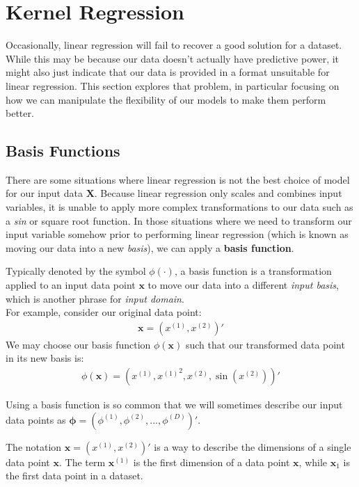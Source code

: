 \section{Kernel Regression}
Occasionally, linear regression will fail to recover a good solution for a dataset. While this may be because our data doesn't actually have predictive power, it might also just indicate that our data is provided in a format unsuitable for linear regression. This section explores that problem, in particular focusing on how we can manipulate the flexibility of our models to make them perform better.

\subsection{Basis Functions}
There are some situations where linear regression is not the best choice of model for our input data $\bm{X}$. Because linear regression only scales and combines input variables, it is unable to apply more complex transformations to our data such as a \textit{sin} or square root function. In those situations where we need to transform our input variable somehow prior to performing linear regression (which is known as moving our data into a new \textit{basis}), we can apply a \textbf{basis function}.

\begin{definition}
    Typically denoted by the symbol $\phi(\cdot)$, a basis function is a transformation applied to an input data point $\bm{x}$ to move our data into a different \textit{input basis}, which is another phrase for \textit{input domain}. \\

    For example, consider our original data point:
    \begin{align*}
    \bm{x} = (x^{(1)}, x^{(2)})'
    \end{align*}
    We may choose our basis function $\phi(\bm{x})$ such that our transformed data point in its new basis is:
    \begin{align*}
        \phi(\bm{x}) = (x^{(1)}, {x^{(1)}}^2, x^{(2)}, \sin(x^{(2)}))'
    \end{align*}

    Using a basis function is so common that we will sometimes describe our input data points as $\boldsymbol{\phi} = (\phi^{(1)}, \phi^{(2)}, ..., \phi^{(D)})'$.
\end{definition}

\begin{warning}
    The notation $\bm{x} = (x^{(1)}, x^{(2)})'$ is a way to describe the dimensions of a single data point $\bm{x}$. The term $\bm{x}^{(1)}$ is the first dimension of a data point $\bm{x}$, while $\bm{x}_1$ is the first data point in a dataset.
\end{warning}

